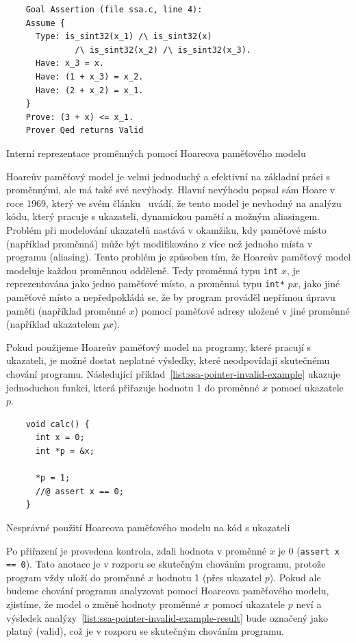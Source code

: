 \begin{listing}[H]
    \begin{verbatim}
    Goal Assertion (file ssa.c, line 4):
    Assume {
      Type: is_sint32(x_1) /\ is_sint32(x)
              /\ is_sint32(x_2) /\ is_sint32(x_3).
      Have: x_3 = x.
      Have: (1 + x_3) = x_2.
      Have: (2 + x_2) = x_1.
    }
    Prove: (3 + x) <= x_1.
    Prover Qed returns Valid
    \end{verbatim}
    \caption{Interní reprezentace proměnných pomocí Hoareova paměťového modelu}
    \label{list:ssa-frama-c}
\end{listing}


Hoareův paměťový model je velmi jednoduchý a efektivní na základní práci s proměnnými, ale má také své nevýhody.
Hlavní nevýhodu popsal sám Hoare v roce 1969, který ve svém článku~\cite{Hoare1969} uvádí,
že tento model je nevhodný na analýzu kódu, který pracuje s ukazateli, dynamickou pamětí a možným aliasingem.
Problém při modelování ukazatelů nastává v okamžiku,
kdy paměťové místo (například proměnná) může být modifikováno z více než jednoho místa v programu (aliasing).
Tento problém je způsoben tím, že Hoareův paměťový model modeluje každou proměnnou odděleně.
Tedy proměnná typu \texttt{int} $x$, je reprezentována jako jedno paměťové místo,
a proměnná typu \texttt{int*} $px$, jako jiné paměťové místo a nepředpokládá se,
že by program prováděl nepřímou úpravu paměťi (například proměnné $x$) pomocí paměťové adresy
uložené v jiné proměnné (například ukazatelem $px$).

Pokud použijeme Hoareův paměťový model na programy, které pracují s ukazateli,
je možné dostat neplatné výsledky, které neodpovídají skutečnému chování programu.
Následující příklad~\ref{list:ssa-pointer-invalid-example} ukazuje jednoduchou funkci,
která přiřazuje hodnotu 1 do proměnné $x$ pomocí ukazatele $p$.

\begin{listing}[H]
    \begin{verbatim}
    void calc() {
      int x = 0;
      int *p = &x;

      *p = 1;
      //@ assert x == 0;
    }
    \end{verbatim}
    \caption{Nesprávné použití Hoareova paměťového modelu na kód s ukazateli}
    \label{list:ssa-pointer-invalid-example}
\end{listing}

Po přiřazení je provedena kontrola, zdali hodnota v proměnné $x$ je 0 (\texttt{assert x == 0}).
Tato anotace je v rozporu se skutečným chováním programu,
protože program vždy uloží do proměnné $x$ hodnotu 1 (přes ukazatel $p$).
Pokud ale budeme chování programu analyzovat pomocí Hoareova paměťového modelu,
zjistíme, že model o změně hodnoty proměnné $x$ pomocí ukazatele $p$ neví
a výsledek analýzy~\ref{list:ssa-pointer-invalid-example-result} bude označený jako platný (valid),
což je v rozporu se skutečným chováním programu.

